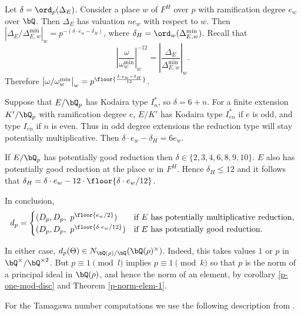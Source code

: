 Let $\delta = \ord_p(\Delta_E)$. Consider a place $w$ of $F^H$ over $p$ with ramification degree  $e_w$over $\bQ$. Then $\Delta_E$ has valuation $n e_w$ with respect to $w$. Then $\left| \Delta_E / \Delta_{E, w}^{\min} \right|_w = p^{-(\delta\cdot e_w - \delta_H)}$, where $\delta_H = \ord_w(\Delta_{E, w}^{\min})$.
Recall that
\[ \left| \frac{\omega}{\omega_{w}^{\min}} \right|_{w}^{-12} = \left| \frac{\Delta_E}{\Delta_{E, w}^{\min}} \right|_w .\] 
Therefore $\left| \omega / \omega_{w}^{\min} \right|_w = p^{\floor{\frac{\delta\cdot e_w - \delta_H}{12}}}$.

Suppose that $E / \bQ_p$ has Kodaira type $I_n^*$, so $\delta = 6 + n$. For a finite extension $K' / \bQ_p$ with ramification degree $e$, $E / K'$ has Kodaira type $I_{en}^*$ if $e$ is odd, and type $I_{en}$ if $n$ is even. Thus in odd degree extensions the reduction type will stay potentially multiplicative. Then $\delta \cdot e_w - \delta_H = 6 e_w$.

If $E / \bQ_p$ has potentially good reduction then $\delta \in \{2,3,4,6,8,9,10 \}$. $E$ also has potentially good reduction at the place $w$ in $F^H$. Hence $\delta_H \leq 12$ and it follows that $\delta_H = \delta \cdot e_w - 12 \cdot \floor{\delta \cdot e_w /12}$.

In conclusion, 
\[ d_p = 
    \begin{cases}
        (D_p, D_p,\ p^{\floor{e_w /2}}) & \text{if } E \text{ has potentially multiplicative reduction}, \\
        (D_p, D_p,\ p^{\floor{\delta \cdot e_w/12}}) & \text{if } E \text { has potentially good reduction}.
    \end{cases}
    \]

In either case, $d_p(\Theta) \in N_{\bQ(\rho) / \bQ}(\bQ(\rho)^{\times})$. Indeed, this takes values $1$ or $p$ in $\bQ^{\times} / \bQ^{\times 2}$. But $p \equiv 1 \pmod l$ implies $p \equiv 1 \pmod k$ so that $p$ is the norm of a principal ideal in $\bQ(\rho)$, and hence the norm of an element, by corollary \ref{p-one-mod-disc} and Theorem \ref{p-norm-elem-1}.


For the Tamagawa number computations we use the following description from \cite{reg-const}.

